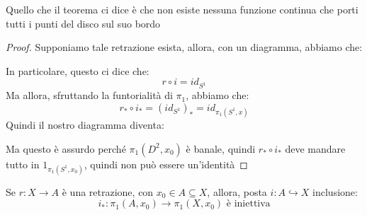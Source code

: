 \documentclass[11pt, a4paper, twoside]{article}
\begin{document}
Quello che il teorema ci dice è che non esiste nessuna funzione continua che porti tutti i punti del disco sul suo bordo

\begin{proof}
	Supponiamo tale retrazione esista, allora, con un diagramma, abbiamo che:
	\begin{center}
	\end{center}
	In particolare, questo ci dice che:
	\[r\circ i = id_{S^1}\]
	Ma allora, sfruttando la funtorialità di $\pi_1$, abbiamo che:
	\[ r_* \circ i_* = (id_{S^1})_* = id_{\pi_1(S^1, x)} \]
	Quindi il nostro diagramma diventa:
	\begin{center}
	\end{center}
	Ma questo è assurdo perché $\pi_1(D^2, x_0)$ è banale, quindi $r_* \circ i_*$ deve mandare tutto in $1_{\pi_1(S^1,x_0)}$, quindi non può essere un'identità
\end{proof}

\begin{ese}
	Se $r:X \to A$ è una retrazione, con $x_0 \in A \subseteq X$, allora, posta $i:A \hookrightarrow X$ inclusione:
	\[ i_*:\pi_1(A,x_0) \to \pi_1(X,x_0) \text{ è iniettiva} \]
\end{ese}
\end{document}
